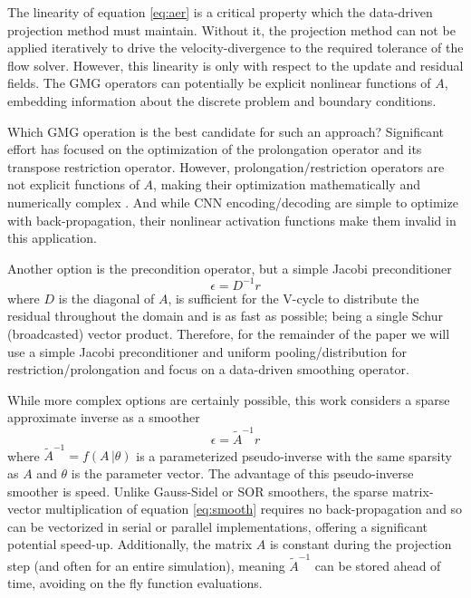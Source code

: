 \documentclass[]{elsarticle}
\begin{document}
The linearity of equation \ref{eq:aer} is a critical property which the data-driven projection method must maintain. Without it, the projection method can not be applied iteratively to drive the velocity-divergence to the required tolerance of the flow solver. However, this linearity is only with respect to the update and residual fields. The GMG operators can potentially be explicit nonlinear functions of $A$, embedding information about the discrete problem and boundary conditions. 

Which GMG operation is the best candidate for such an approach? Significant effort has focused on the optimization of the prolongation operator and its transpose restriction operator. However, prolongation/restriction operators are not explicit functions of $A$, making their optimization mathematically and numerically complex \cite{KATRUTSA2020112524,greenfeld2019learning}. And while CNN encoding/decoding are simple to optimize with back-propagation, their nonlinear activation functions make them invalid in this application. 

Another option is the precondition operator, but a simple Jacobi preconditioner
\begin{equation}
    \epsilon = D^{-1}r
\end{equation}
where $D$ is the diagonal of $A$, is sufficient for the V-cycle to distribute the residual throughout the domain and is as fast as possible; being a single Schur (broadcasted) vector product. Therefore, for the remainder of the paper we will use a simple Jacobi preconditioner and uniform pooling/distribution for restriction/prolongation and focus on a data-driven smoothing operator.

While more complex options are certainly possible, this work considers a sparse approximate inverse as a smoother
\begin{equation}\label{eq:smooth}
    \epsilon = \tilde A^{-1}r
\end{equation}
where $\tilde A^{-1}=f(A\,|\theta)$ is a parameterized pseudo-inverse with the same sparsity as $A$ and $\theta$ is the parameter vector. The advantage of this pseudo-inverse smoother is speed. Unlike Gauss-Sidel or SOR smoothers, the sparse matrix-vector multiplication of equation \ref{eq:smooth} requires no back-propagation and so can be vectorized in serial or parallel implementations, offering a significant potential speed-up. Additionally, the matrix $A$ is constant during the projection step (and often for an entire simulation), meaning $\tilde A^{-1}$ can be stored ahead of time, avoiding on the fly function evaluations.
\end{document}
